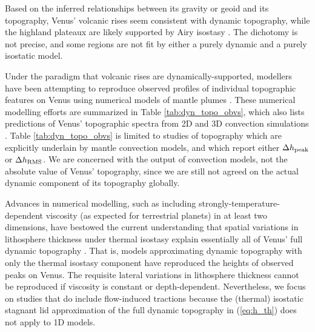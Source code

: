 Based on the inferred relationships between its gravity or geoid and its topography, Venus' volcanic rises seem consistent with dynamic topography, while the highland plateaux are likely supported by Airy isostasy \citep{Kiefer1986, Grimm1991, Kiefer1991, Smrekar1994, McKenzie1994, Kucinskas1994, Smrekar1996, Nimmo1996, Simons1997, Pauer2006, James2013, Yang2016}. The dichotomy is not precise, and some regions are not fit by either a purely dynamic and a purely isostatic model. 

Under the paradigm that volcanic rises are dynamically-supported, modellers have been attempting to reproduce observed profiles of individual topographic features on Venus using numerical models of mantle plumes \citep{Kiefer1991, Kiefer1992, Moresi1995, Nimmo1996, Smrekar1996, Kiefer1998}. These numerical modelling efforts are summarized in Table \ref{tab:dyn_topo_obvs}, which also lists predictions of Venus' topographic spectra from 2D and 3D convection simulations \citep{Golle2012, Benesova2012, Huang2013, Yang2016}. Table \ref{tab:dyn_topo_obvs} is limited to studies of topography which are explicitly underlain by mantle convection models, and which report either $\Delta h_{\rm peak}$ or $\Delta h_{\rm RMS}$. We are concerned with the output of convection models, not the absolute value of Venus' topography, since we are still not agreed on the actual dynamic component of its topography globally.


Advances in numerical modelling, such as including strongly-temperature-dependent viscosity (as expected for terrestrial planets) in at least two dimensions, have bestowed the current understanding that spatial variations in lithosphere thickness under thermal isostasy explain essentially all of Venus' full dynamic topography \citep{Kucinskas1994, Moore1995, Moore1997, Solomatov1996a, Orth2011}. That is, models approximating dynamic topography with only the thermal isostasy component have reproduced the heights of observed peaks on Venus. The requisite lateral variations in lithosphere thickness cannot be reproduced if viscosity is constant or depth-dependent. Nevertheless, we focus on studies that do include flow-induced tractions because the (thermal) isostatic stagnant lid approximation of the full dynamic topography in (\ref{eq:h_th}) does not apply to 1D models.



